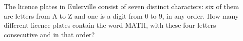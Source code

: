 The licence plates in Eulerville consist of seven distinct characters: six of them are letters from A to Z and one is a digit from $0$ to $9$, in any order. How many different licence plates contain the word MATH, with these four letters consecutive and in that order?
